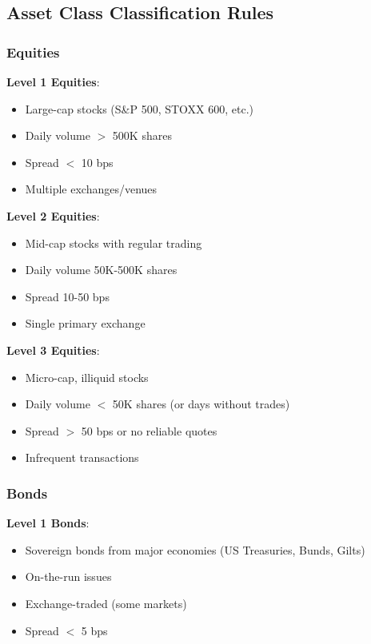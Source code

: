 \documentclass[11pt,a4paper]{article}
\begin{document}
\subsection{Asset Class Classification Rules}

\subsubsection{Equities}

\textbf{Level 1 Equities}:
\begin{itemize}
    \item Large-cap stocks (S\&P 500, STOXX 600, etc.)
    \item Daily volume $>$ 500K shares
    \item Spread $<$ 10 bps
    \item Multiple exchanges/venues
\end{itemize}

\textbf{Level 2 Equities}:
\begin{itemize}
    \item Mid-cap stocks with regular trading
    \item Daily volume 50K-500K shares
    \item Spread 10-50 bps
    \item Single primary exchange
\end{itemize}

\textbf{Level 3 Equities}:
\begin{itemize}
    \item Micro-cap, illiquid stocks
    \item Daily volume $<$ 50K shares (or days without trades)
    \item Spread $>$ 50 bps or no reliable quotes
    \item Infrequent transactions
\end{itemize}

\subsubsection{Bonds}

\textbf{Level 1 Bonds}:
\begin{itemize}
    \item Sovereign bonds from major economies (US Treasuries, Bunds, Gilts)
    \item On-the-run issues
    \item Exchange-traded (some markets)
    \item Spread $<$ 5 bps
\end{itemize}
\end{document}
